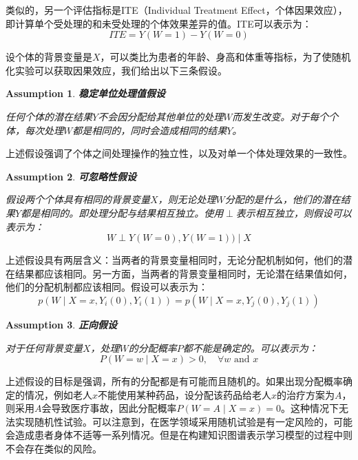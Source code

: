 \documentclass[algorithmlist, AutoFakeBold, AutoFakeSlant, figurelist, tablelist, nomlist, masters]{seuthesix}
\begin{document}
类似的，另一个评估指标是ITE（Individual Treatment Effect，个体因果效应），即计算单个受处理的和未受处理的个体效果差异的值。ITE可以表示为：
\begin{equation}
  ITE=Y(W=1) - Y(W=0)
  \label{equation_ITE}
\end{equation}

设个体的背景变量是$X$，可以类比为患者的年龄、身高和体重等指标，为了使随机化实验可以获取因果效应，我们给出以下三条假设。
\newtheorem{assumption}{Assumption}[section]
\begin{assumption}
  \textbf{稳定单位处理值假设}

  任何个体的潜在结果$Y$不会因分配给其他单位的处理$W$而发生改变。对于每个个体，每次处理$W$都是相同的，同时会造成相同的结果$Y$。
\end{assumption}
上述假设强调了个体之间处理操作的独立性，以及对单一个体处理效果的一致性。

\begin{assumption}
  \textbf{可忽略性假设}

  假设两个个体具有相同的背景变量$X$，则无论处理$W$分配的是什么，他们的潜在结果$Y$都是相同的。即处理分配与结果相互独立。使用$\perp$表示相互独立，则假设可以表示为：
  \begin{equation}
    W \perp Y(W=0), Y(W=1)) \mid X
  \end{equation}
\end{assumption}
上述假设具有两层含义：当两者的背景变量相同时，无论分配机制如何，他们的潜在结果都应该相同。另一方面，当两者的背景变量相同时，无论潜在结果值如何，他们的分配机制都应该相同。假设可以表示为：
\begin{equation}
  p\left(W \mid X=x, Y_i(0), Y_i(1)\right)=p\left(W \mid X=x, Y_j(0), Y_j(1)\right)
\end{equation}

\begin{assumption}
  \textbf{正向假设}

  对于任何背景变量$X$，处理$W$的分配概率$P$都不能是确定的。可以表示为：
  \begin{equation}
    P(W=w \mid X=x)>0, \quad \forall w \text { and } x
  \end{equation}
\end{assumption}
上述假设的目标是强调，所有的分配都是有可能而且随机的。如果出现分配概率确定的情况，例如老人$x$不能使用某种药品，设分配该药品给老人$x$的治疗方案为$A$，则采用$A$会导致医疗事故，因此分配概率$P(W=A \mid X=x) = 0$。这种情况下无法实现随机性试验。可以注意到，在医学领域采用随机试验是有一定风险的，可能会造成患者身体不适等一系列情况。但是在构建知识图谱表示学习模型的过程中则不会存在类似的风险。
\end{document}
